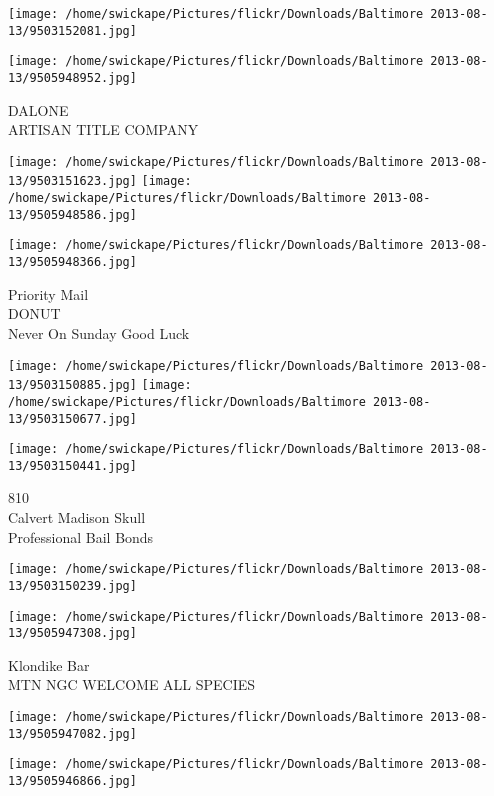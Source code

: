 \documentclass[10pt,letterpaper]{article}
\begin{document}
\texttt{[image: /home/swickape/Pictures/flickr/Downloads/Baltimore 2013-08-13/9503152081.jpg]}

\vspace{0.25in}
\texttt{[image: /home/swickape/Pictures/flickr/Downloads/Baltimore 2013-08-13/9505948952.jpg]}

DALONE\\
ARTISAN TITLE COMPANY\\
\pagebreak

\texttt{[image: /home/swickape/Pictures/flickr/Downloads/Baltimore 2013-08-13/9503151623.jpg]}
\texttt{[image: /home/swickape/Pictures/flickr/Downloads/Baltimore 2013-08-13/9505948586.jpg]}

\vspace{0.25in}
\texttt{[image: /home/swickape/Pictures/flickr/Downloads/Baltimore 2013-08-13/9505948366.jpg]}

Priority Mail\\
DONUT\\
Never On Sunday Good Luck\\
\pagebreak

\texttt{[image: /home/swickape/Pictures/flickr/Downloads/Baltimore 2013-08-13/9503150885.jpg]}
\texttt{[image: /home/swickape/Pictures/flickr/Downloads/Baltimore 2013-08-13/9503150677.jpg]}

\texttt{[image: /home/swickape/Pictures/flickr/Downloads/Baltimore 2013-08-13/9503150441.jpg]}

810\\
Calvert Madison Skull\\
Professional Bail Bonds\\
\pagebreak

\texttt{[image: /home/swickape/Pictures/flickr/Downloads/Baltimore 2013-08-13/9503150239.jpg]}

\vspace{0.25in}
\texttt{[image: /home/swickape/Pictures/flickr/Downloads/Baltimore 2013-08-13/9505947308.jpg]}

Klondike Bar\\
MTN NGC WELCOME ALL SPECIES\\
\pagebreak

\texttt{[image: /home/swickape/Pictures/flickr/Downloads/Baltimore 2013-08-13/9505947082.jpg]}

\vspace{0.25in}
\texttt{[image: /home/swickape/Pictures/flickr/Downloads/Baltimore 2013-08-13/9505946866.jpg]}
\end{document}
